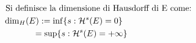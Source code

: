 \documentclass[preview]{standalone}
\begin{document}
\begin{align*}
\text{Si definisce la dimensione di Hausdorﬀ di E come:} \\ \dim_H(E) := \inf\{ s : \mathcal{H}^s(E) = 0\} \hspace{2.85 cm} \\ = \sup\{ s : \mathcal{H}^s(E) = + \infty \}  \hspace{2.65 cm}
\end{align*}
\end{document}
